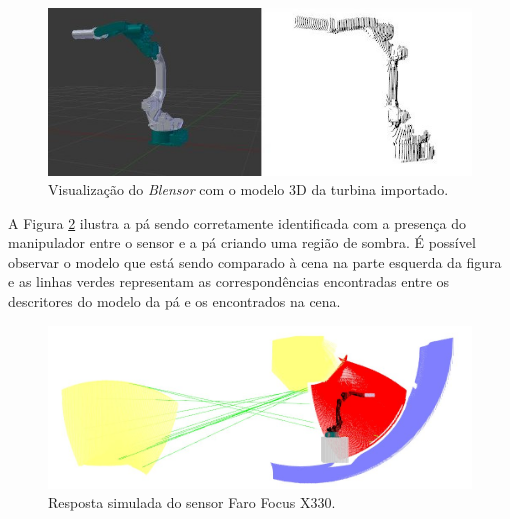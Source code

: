 \begin{figure}[H]
	\centering
	\includegraphics[width=0.9\columnwidth]{figs/calibracao/mh12_model}
	\caption{Visualização do \textit{Blensor} com o modelo 3D da turbina
	importado.}
    \label{fig::model_mh12}
\end{figure}

A Figura \ref{fig::sim_mh12}
ilustra a pá sendo corretamente identificada com a presença do manipulador entre
o sensor e a pá criando uma região de sombra. É possível observar o modelo que
está sendo comparado à cena na parte esquerda da figura e as linhas verdes
representam as correspondências encontradas entre os descritores do modelo da pá
e os encontrados na cena.

\begin{figure}[H]
	\centering
	\includegraphics[width=0.9\columnwidth]{figs/calibracao/sim_mh12_sp}
	\caption{Resposta simulada do sensor Faro Focus X330.}
    \label{fig::sim_mh12}
\end{figure}	
